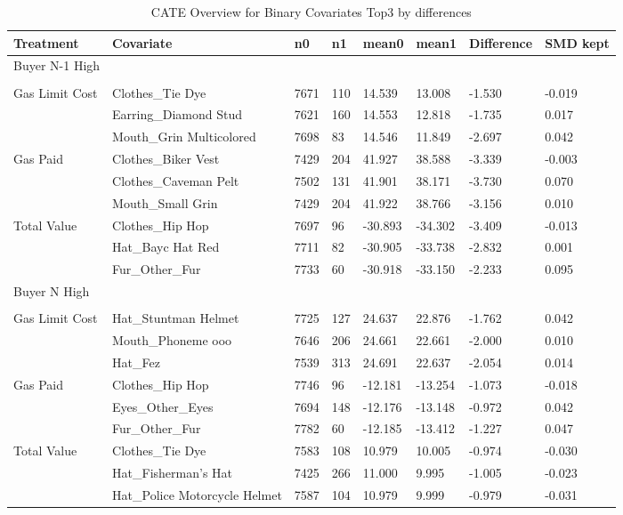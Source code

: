 \begin{table}
\caption{CATE Overview for Binary Covariates Top3 by differences}
\label{tab:m2\_cate\_b}
\begin{tabular}{llllllll}
\toprule
Treatment & Covariate & n0 & n1 & mean0 & mean1 & Difference & SMD kept\\
\midrule
Buyer N-1 High &  &  &  &  &  &  & \\
 &  &  &  &  &  &  & \\
Gas Limit Cost & Clothes\_Tie Dye & 7671 & 110 & 14.539 & 13.008 & -1.530 & -0.019\\
 & Earring\_Diamond Stud & 7621 & 160 & 14.553 & 12.818 & -1.735 & 0.017\\
 & Mouth\_Grin Multicolored & 7698 & 83 & 14.546 & 11.849 & -2.697 & 0.042\\
Gas Paid & Clothes\_Biker Vest & 7429 & 204 & 41.927 & 38.588 & -3.339 & -0.003\\
 & Clothes\_Caveman Pelt & 7502 & 131 & 41.901 & 38.171 & -3.730 & 0.070\\
 & Mouth\_Small Grin & 7429 & 204 & 41.922 & 38.766 & -3.156 & 0.010\\
Total Value & Clothes\_Hip Hop & 7697 & 96 & -30.893 & -34.302 & -3.409 & -0.013\\
 & Hat\_Bayc Hat Red & 7711 & 82 & -30.905 & -33.738 & -2.832 & 0.001\\
 & Fur\_Other\_Fur & 7733 & 60 & -30.918 & -33.150 & -2.233 & 0.095\\
Buyer N High &  &  &  &  &  &  & \\
 &  &  &  &  &  &  & \\
Gas Limit Cost & Hat\_Stuntman Helmet & 7725 & 127 & 24.637 & 22.876 & -1.762 & 0.042\\
 & Mouth\_Phoneme  ooo & 7646 & 206 & 24.661 & 22.661 & -2.000 & 0.010\\
 & Hat\_Fez & 7539 & 313 & 24.691 & 22.637 & -2.054 & 0.014\\
Gas Paid & Clothes\_Hip Hop & 7746 & 96 & -12.181 & -13.254 & -1.073 & -0.018\\
 & Eyes\_Other\_Eyes & 7694 & 148 & -12.176 & -13.148 & -0.972 & 0.042\\
 & Fur\_Other\_Fur & 7782 & 60 & -12.185 & -13.412 & -1.227 & 0.047\\
Total Value & Clothes\_Tie Dye & 7583 & 108 & 10.979 & 10.005 & -0.974 & -0.030\\
 & Hat\_Fisherman's Hat & 7425 & 266 & 11.000 & 9.995 & -1.005 & -0.023\\
 & Hat\_Police Motorcycle Helmet & 7587 & 104 & 10.979 & 9.999 & -0.979 & -0.031\\

\end{tabular}
\end{table}
